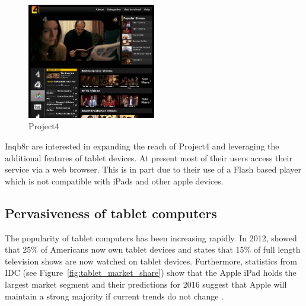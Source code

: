 	\begin{figure}[htb]
		\centering
			\includegraphics[width=0.5\textwidth]{images/project4.png}
		\caption{Project4}
		\label{fig:project4}
	\end{figure}

	Inqb8r are interested in expanding the reach of Project4 and leveraging the additional features of tablet devices. At present most of their users access their service via a web browser. This is in part due to their use of a Flash based player which is not compatible with iPads and other apple devices.
	

\subsection{Pervasiveness of tablet computers}
	The popularity of tablet computers has been increasing rapidly. In 2012, \citet{pewResearch} showed that 25\% of Americans now own tablet devices and \citet{viacom} states that 15\% of full length television shows are now watched on tablet devices. Furthermore, statistics from IDC (see Figure~\ref{fig:tablet_market_share}) show that the Apple iPad holds the largest market segment and their predictions for 2016 suggest that Apple will maintain a strong majority if current trends do not change \citet{IDCPredictions}.

